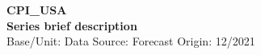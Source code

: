 \documentclass[a4paper,12pt]{article}
\begin{document}
\thispagestyle{empty}
\begin{landscape}
\begin{center}

\textbf{CPI_USA} \\ 

\textbf{Series brief description} \\ 

Base/Unit: 
\space \space \space Data Source:  
\space \space \space Forecast Origin: 12/2021 \\ 
\end{center}

\begin{small}   \end{small} 

\end{landscape}
\end{document}
